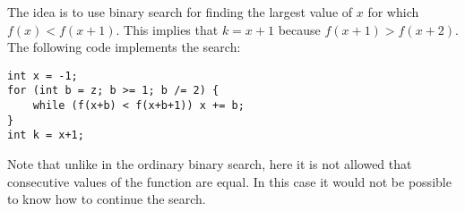 The idea is to use binary search
for finding the largest value of $x$
for which $f(x)<f(x+1)$.
This implies that $k=x+1$
because $f(x+1)>f(x+2)$.
The following code implements the search:

\begin{lstlisting}
int x = -1;
for (int b = z; b >= 1; b /= 2) {
    while (f(x+b) < f(x+b+1)) x += b;
}
int k = x+1;
\end{lstlisting}

Note that unlike in the ordinary binary search,
here it is not allowed that consecutive values
of the function are equal.
In this case it would not be possible to know
how to continue the search.
